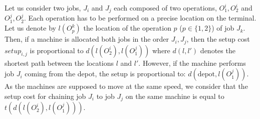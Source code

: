 \documentclass[a4paper,10pt]{article}
\begin{document}
Let us consider two jobs, $J_i$ and $J_j$ each composed of two operations, $O^i_1, O^i_2$ and $O^j_1, O^j_2$. Each operation has to be performed on a precise location on the terminal. Let us denote by $l(O^k_p)$ the location of the operation $p$ ($p \in \{1,2\}$) of job $J_k$. Then, if a machine is allocated both jobs in the order $J_i, J_j$, then the setup cost $setup_{i,j}$ is proportional to $d(l(O^i_2),l(O^j_1))$ where $d(l,l')$ denotes the shortest path between the locations $l$ and $l'$. However, if the machine performs job $J_i$ coming from the depot, the setup is proportional to: $d(\mbox{depot},l(O^j_1))$. As the machines are supposed to move at the same speed, we consider that the setup cost for chaining job $J_i$ to job $J_j$ on the same machine is equal to $t(d(l(O^i_2),l(O^j_1)))$. %
%
 

\end{document}
